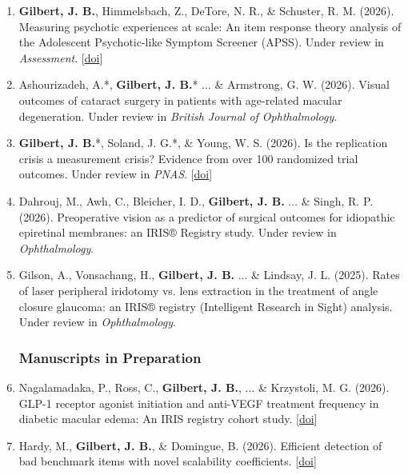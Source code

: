 \documentclass[11pt]{article}
\begin{document}
\begin{enumerate}
\item \textbf{Gilbert, J. B.}, Himmelsbach, Z., DeTore, N. R., \& Schuster, R. M. (2026). Measuring psychotic experiences at scale: An item response theory analysis of the Adolescent Psychotic-like Symptom Screener (APSS). Under review in \textit{Assessment}. [\href{https://doi.org/10.31234/osf.io/4pv75_v2}{doi}]
\item Ashourizadeh, A.*, \textbf{Gilbert, J. B.}* ... \& Armstrong, G. W. (2026). Visual outcomes of cataract surgery in patients with age-related macular degeneration. Under review in \textit{British Journal of Ophthalmology}.
\item \textbf{Gilbert, J. B.}*, Soland, J. G.*, \& Young, W. S. (2026). Is the replication crisis a measurement crisis? Evidence from over 100 randomized trial outcomes. Under review in \textit{PNAS}. [\href{https://osf.io/preprints/psyarxiv/9zgj8_v1}{doi}]
\item Dahrouj, M., Awh, C., Bleicher, I. D., \textbf{Gilbert, J. B.} ... \& Singh, R. P. (2026). Preoperative vision as a predictor of surgical outcomes for idiopathic epiretinal membranes: an IRIS® Registry study. Under review in \textit{Ophthalmology}.
\item Gilson, A., Vonsachang, H., \textbf{Gilbert, J. B.} ... \& Lindsay, J. L. (2025). Rates of laser peripheral iridotomy vs. lens extraction in the treatment of angle closure glaucoma: an IRIS® registry (Intelligent Research in Sight) analysis. Under review in \textit{Ophthalmology}.

\subsubsection{Manuscripts in Preparation}


\item Nagalamadaka, P., Ross, C., \textbf{Gilbert, J. B.}, ... \& Krzystoli, M. G. (2026). GLP-1 receptor agonist initiation and anti-VEGF treatment frequency in diabetic macular edema: An IRIS registry cohort study. [\href{https://www.medrxiv.org/content/10.64898/2026.08.29.26361426v1}{doi}]
\item Hardy, M., \textbf{Gilbert, J. B.}, \& Domingue, B. (2026). Efficient detection of bad benchmark items with novel scalability coefficients. [\href{https://arxiv.org/abs/2603.24999}{doi}]


\end{enumerate}
\end{document}
